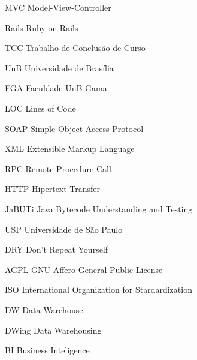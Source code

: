 \begin{siglas}
  
  \item[MVC] Model-View-Controller
  \item[Rails] Ruby on Rails
  \item[TCC] Trabalho de Conclusão de Curso
  \item[UnB] Universidade de Brasília
  \item[FGA] Faculdade UnB Gama
  \item[LOC] Lines of Code
  \item[SOAP] Simple Object Access Protocol
  \item[XML] Extensible Markup Language
  \item[RPC] Remote Procedure Call
  \item[HTTP] Hipertext Transfer
  \item[JaBUTi] Java Bytecode Understanding and Testing
  \item[USP] Universidade de São Paulo
  \item[DRY] Don't Repeat Yourself
  \item[AGPL] GNU Affero General Public License
  \item[ISO] International Organization for Stardardization
  \item[DW] Data Warehouse
  \item[DWing] Data Warehousing
  \item[BI] Business Inteligence
  
\end{siglas}

